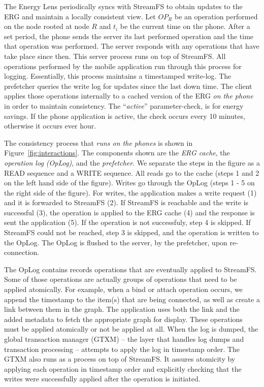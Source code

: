 The Energy Lens periodically syncs with StreamFS to obtain updates to the ERG and maintain a locally consistent view.  
Let $OP_R$ be an operation performed on the node rooted at node $R$ and $t_i$ be the current time on the phone.  
After a set period, the phone sends the server
its last performed operation and the time that operation was performed.  The server responds with any operations that have
take place since then.  This server process runs on top of StreamFS.  All operations performed by the mobile application
run through this process for logging.  Essentially, this process maintains a timestamped write-log.  The prefetcher
queries the write log for updates since the last down time.
The client applies those operations internally to a cached version of the ERG \emph{on the phone} in order to 
maintain consistency.  The ``\emph{active}'' parameter-check, is for energy savings.  If the phone application is active, the
check occurs every 10 minutes, otherwise it occurs ever hour.

The consistency process that \emph{runs on the phones} is shown in Figure~\ref{fig:interactions}.  The components shown 
are the \emph{ERG cache}, the \emph{operation
log (OpLog)}, and the \emph{prefetcher}.  We separate the steps in the figure as a READ sequence and a WRITE sequence.
All reads go to the cache (steps 1 and 2 on the left hand side of the figure).  Writes go through the OpLog (steps 1 - 5 on the right
side of the figure).  For writes, 
the application makes a write request (1) and it is forwarded to StreamFS (2).  If StreamFS is reachable and the write is
successful (3), the operation is applied to the ERG cache (4) and the response is sent the application (5).
If the operation is not successfuly, step 4 is skipped.  If StreamFS could not be reached, step 3 is skipped, and the operation
is written to the OpLog.  The OpLog is flushed to the server, by the prefetcher, upon re-connection. 

The OpLog contains records operations that are eventually applied to StreamFS.  Some of those operations
are actually groups of operations that need to be applied atomically.  For example, 
when a bind or attach operation occurs, we append the timestamp to the item(s) that are being connected, as well as create
a link between them in the graph.  The application uses both the link and the added metadata to fetch the appropriate
graph for display.  These operations must be applied atomically or not be applied at all.
When the log is dumped, the global transaction manager (GTXM) -- the layer that handles log dumps and transaction processing --
attempts to apply the log in timestamp order.  The GTXM also runs as a process on top of StreamFS.  It assures atomicity
by applying each operation in timestamp order and explicitly checking that the writes were successfully applied after 
the operation is initiated.


